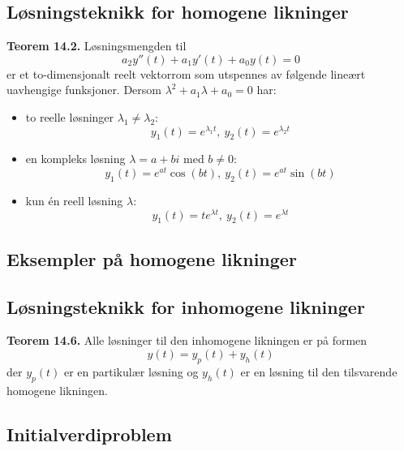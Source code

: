 \documentclass{article}
\begin{document}
\subsection{Løsningsteknikk for homogene likninger}
\textbf{Teorem 14.2.} Løsningsmengden til
\[ a_2y''(t) + a_1y'(t) + a_0y(t) = 0 \]
er et to-dimensjonalt reelt vektorrom som utspennes av følgende lineært uavhengige funksjoner. Dersom $\lambda ^2 + a_1\lambda + a_0 = 0$ har:
\begin{itemize}
    \item to reelle løsninger $\lambda_1 \neq \lambda_2$:
    \[ y_1(t) = e^{\lambda_1 t}, \ y_2(t) = e^{\lambda_2 t} \]
    \item en kompleks løsning $\lambda = a + bi$ med $b \neq 0$:
    \[ y_1(t) = e^{at}\cos{(bt)}, \ y_2(t) = e^{at}\sin{(bt)} \]
    \item kun én reell løsning $\lambda$:
    \[ y_1(t) = te^{\lambda t}, \ y_2(t) = e^{\lambda t} \]
\end{itemize}


\subsection{Eksempler på homogene likninger}


\subsection{Løsningsteknikk for inhomogene likninger}
\textbf{Teorem 14.6.} Alle løsninger til den inhomogene likningen er på formen
\[ y(t) = y_p(t) + y_h(t) \]
der $y_p(t)$ er en partikulær løsning og $y_h(t)$ er en løsning til den tilsvarende homogene likningen.

\subsection{Initialverdiproblem}
\end{document}
